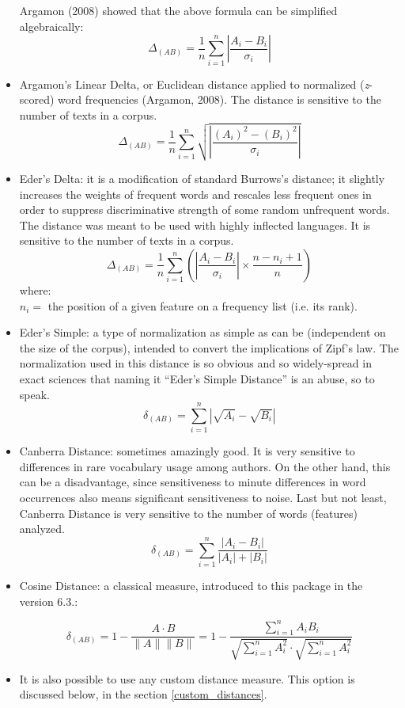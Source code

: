\documentclass[11pt,a4paper]{article}
\def\margin#1{\marginpar{\textcolor{blue}{\footnotesize\tt #1}}}
\begin{document}
\begin{itemize}
\noindent Argamon (2008) showed that the above formula can be simplified
algebraically: 
\[
\Delta_{(AB)}=\frac{1}{n}\sum_{i=1}^{n}\left\vert \frac{A_{i}-B_{i}}{\sigma_{i}}\right\vert 
\]


\item Argamon's Linear Delta, or Euclidean distance applied to normalized
(\textit{z}-scored) word frequencies (Argamon, 2008).\margin{"dist.argamon"}
The distance is sensitive to the number of texts in a corpus. 
\[
\Delta_{(AB)}=\frac{1}{n}\sum_{i=1}^{n}\sqrt{\left\vert \frac{(A_{i})^{2}-(B_{i})^{2}}{\sigma_{i}}\right\vert }
\]

\item Eder's Delta: it is a modification of standard Burrows's distance;\margin{"dist.eder"}
it slightly increases the weights of frequent words and rescales less
frequent ones in order to suppress discriminative strength of some
random unfrequent words. The distance was meant to be used with highly
inflected languages. It is sensitive to the number of texts in a corpus.
\[
\Delta_{(AB)}=\frac{1}{n}\sum_{i=1}^{n}\left(\left\vert \frac{A_{i}-B_{i}}{\sigma_{i}}\right\vert \times\frac{n-n_{i}+1}{n}\right)
\]
where: \\
 $n_{i}=$ the position of a given feature on a frequency list (i.e. its rank).

\item Eder's Simple: a type of normalization as simple as can be (independent
on the size of the corpus), intended to convert the implications of
Zipf's law.\margin{"dist.simple"} The normalization
used in this distance is so obvious and so widely-spread in exact
sciences that naming it ``Eder's Simple Distance'' is an abuse, so to
speak. 
\[
\delta_{(AB)}=\sum_{i=1}^{n}\left\vert \sqrt{A_{i}}-\sqrt{B_{i}}\right\vert 
\]

\item Canberra Distance: sometimes amazingly good.\margin{"dist.canberra"}
It is very sensitive to differences in rare vocabulary usage among
authors. On the other hand, this can be a disadvantage, since sensitiveness
to minute differences in word occurrences also means significant sensitiveness
to noise. Last but not least, Canberra Distance is very sensitive
to the number of words (features) analyzed. 
\[
\delta_{(AB)}=\sum_{i=1}^{n}\frac{\left\vert A_{i}-B_{i}\right\vert }{\left\vert A_{i}\right\vert +\left\vert B_{i}\right\vert }
\]

\item Cosine Distance: a classical measure, introduced to this package 
in the version 6.3.\margin{"dist.cosine"}:

\[
\delta_{(AB)}=1- \frac{A\cdot B}{\|A\|\|B\|}= 1- \frac{\sum\limits _{i=1}^{n}{A_{i}B_{i}}}{\sqrt{\sum\limits _{i=1}^{n}{A_{i}^2}}\cdot\sqrt{\sum\limits _{i=1}^{n}{A_{i}^2}}}
\]



\item It is also possible to use any custom distance measure. This option is 
discussed below, in the section \ref{custom_distances}.

\end{itemize}
\end{document}
